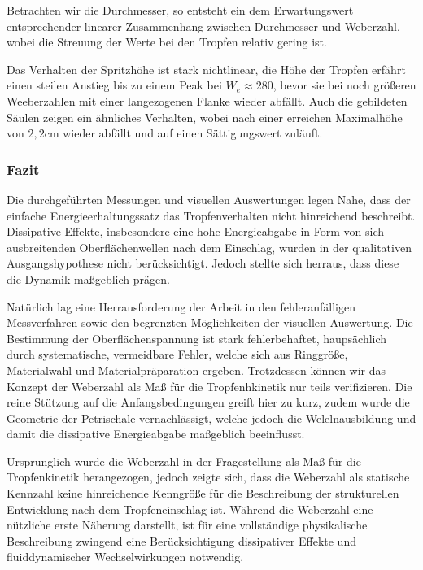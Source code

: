 \documentclass[twocolumn,10pt]{extarticle}
\begin{document}
Betrachten wir die Durchmesser, so entsteht ein dem Erwartungswert entsprechender linearer Zusammenhang zwischen Durchmesser und Weberzahl, wobei die Streuung der Werte bei den Tropfen relativ gering ist.

Das Verhalten der Spritzhöhe ist stark nichtlinear, die Höhe der Tropfen erfährt einen steilen Anstieg bis zu einem Peak bei $W_e \approx 280$, bevor sie bei noch größeren Weeberzahlen 
mit einer langezogenen Flanke wieder abfällt. Auch die gebildeten Säulen zeigen ein ähnliches Verhalten, wobei nach einer erreichen Maximalhöhe von $2,2 \unit{\centi\meter}$ wieder abfällt und auf 
einen Sättigungswert zuläuft. 
\subsubsection{Fazit}
Die durchgeführten Messungen und visuellen Auswertungen legen Nahe, dass der einfache Energieerhaltungssatz das Tropfenverhalten nicht hinreichend beschreibt. Dissipative 
Effekte, insbesondere eine hohe Energieabgabe in Form von sich ausbreitenden Oberflächenwellen nach dem Einschlag, wurden in der qualitativen Ausgangshypothese nicht berücksichtigt.
Jedoch stellte sich herraus, dass diese die Dynamik maßgeblich prägen.

Natürlich lag eine Herrausforderung der Arbeit in den fehleranfälligen Messverfahren sowie den begrenzten Möglichkeiten der visuellen Auswertung. Die Bestimmung der Oberflächenspannung 
ist stark fehlerbehaftet, haupsächlich durch systematische, vermeidbare Fehler, welche sich aus Ringgröße, Materialwahl und Materialpräparation ergeben.
Trotzdessen können wir das Konzept der Weberzahl als Maß für die Tropfenhkinetik nur teils verifizieren. Die reine Stützung auf die Anfangsbedingungen greift hier zu kurz, zudem wurde die
Geometrie der Petrischale vernachlässigt, welche jedoch die Welelnausbildung und damit die dissipative Energieabgabe maßgeblich beeinflusst. 

Ursprunglich wurde die Weberzahl in der Fragestellung als Maß für die Tropfenkinetik herangezogen, jedoch zeigte sich, dass die Weberzahl als statische Kennzahl keine hinreichende 
Kenngröße für die Beschreibung der strukturellen Entwicklung nach dem Tropfeneinschlag ist. Während die Weberzahl eine nützliche erste Näherung darstellt, ist für eine vollständige 
physikalische Beschreibung zwingend eine Berücksichtigung dissipativer Effekte und fluiddynamischer Wechselwirkungen notwendig. 
\end{document}
